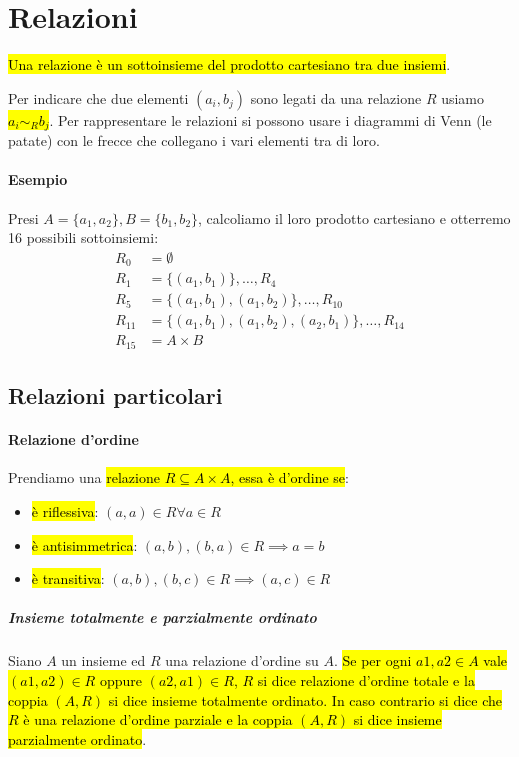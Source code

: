 \documentclass[a4paper,12pt,oneside]{article}
\begin{document}
\section{Relazioni}
\hl{Una relazione è un sottoinsieme del prodotto cartesiano tra due insiemi}.

Per indicare che due elementi $(a_i, b_j)$ sono legati da una relazione
$R$ usiamo \hl{$a_i \sim_R b_j$}. Per rappresentare le relazioni si possono usare i
diagrammi di Venn (le patate) con le frecce che collegano i vari elementi tra di
loro.

\paragraph{Esempio} Presi $A = \{a_1, a_2\}, B = \{b_1, b_2\}$, calcoliamo il
loro prodotto cartesiano e otterremo 16 possibili sottoinsiemi:
\begin{align*}
    R_0 &= \emptyset \\
    R_1 &= \{(a_1, b_1)\}, \dots, R_4 \\
    R_5 &= \{(a_1, b_1), (a_1, b_2)\}, \dots, R_{10} \\
    R_{11} &= \{(a_1, b_1), (a_1, b_2), (a_2, b_1)\}, \dots, R_{14} \\
    R_{15} &= A \times B
\end{align*}

\subsection{Relazioni particolari}
\paragraph{Relazione d'ordine} Prendiamo una \hl{relazione
$R \subseteq A \times A$, essa è d'ordine se}:
\begin{itemize}
    \item \hl{è riflessiva}: $(a,a) \in R \forall a \in R$
    \item \hl{è antisimmetrica}: $(a,b),(b,a) \in R \implies a=b$
    \item \hl{è transitiva}: $(a,b), (b,c) \in R \implies (a,c) \in R$
\end{itemize}

\subparagraph{Insieme totalmente e parzialmente ordinato} Siano $A$ un insieme ed
$R$ una relazione d’ordine su $A$. \hl{Se per ogni $a1 , a2 \in A$ vale
$(a1, a2) \in R$ oppure $(a2 , a1 ) \in R$, $R$ si dice relazione d’ordine
totale e la coppia $(A, R)$ si dice insieme totalmente ordinato. In caso
contrario si dice che $R$ è una relazione d’ordine parziale e la coppia $(A, R)$
si dice insieme parzialmente ordinato}.
\end{document}
